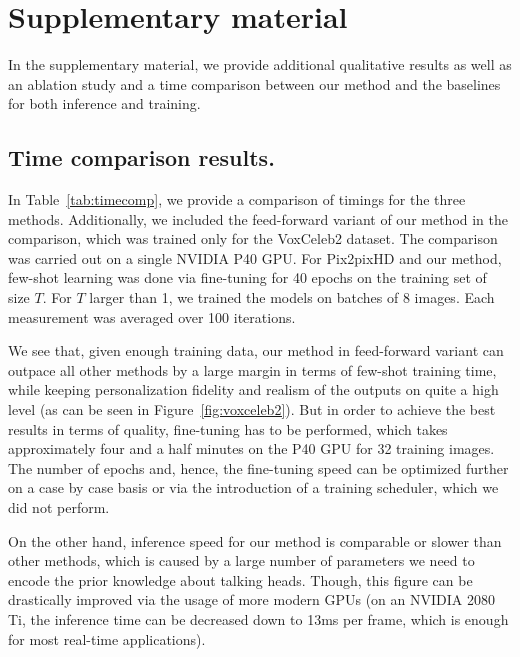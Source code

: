 \documentclass[10pt,twocolumn,letterpaper]{article}
\newcommand{\fig}[1]{Figure~\ref{fig:#1}}
\newcommand{\tab}[1]{Table~\ref{tab:#1}}
\begin{document}
\vfill 
{\small


}

\appendix
\clearpage

\section{Supplementary material}

In the supplementary material, we provide additional qualitative results as well as an ablation study and a time comparison between our method and the baselines for both inference and training.

\subsection{Time comparison results.}

In \tab{timecomp}, we provide a comparison of timings for the three methods. Additionally, we included the feed-forward variant of our method in the comparison, which was trained only for the VoxCeleb2 dataset. The comparison was carried out on a single NVIDIA P40 GPU. For Pix2pixHD and our method, few-shot learning was done via fine-tuning for 40 epochs on the training set of size $T$. For $T$ larger than 1, we trained the models on batches of $8$ images. Each measurement was averaged over 100 iterations.

We see that, given enough training data, our method in feed-forward variant can outpace all other methods by a large margin in terms of few-shot training time, while keeping personalization fidelity and realism of the outputs on quite a high level (as can be seen in \fig{voxceleb2}). But in order to achieve the best results in terms of quality, fine-tuning has to be performed, which takes approximately four and a half minutes on the P40 GPU for 32 training images. The number of epochs and, hence, the fine-tuning speed can be optimized further on a case by case basis or via the introduction of a training scheduler, which we did not perform.

On the other hand, inference speed for our method is comparable or slower than other methods, which is caused by a large number of parameters we need to encode the prior knowledge about talking heads. Though, this figure can be drastically improved via the usage of more modern GPUs (on an NVIDIA 2080 Ti, the inference time can be decreased down to 13ms per frame, which is enough for most real-time applications).
\end{document}
